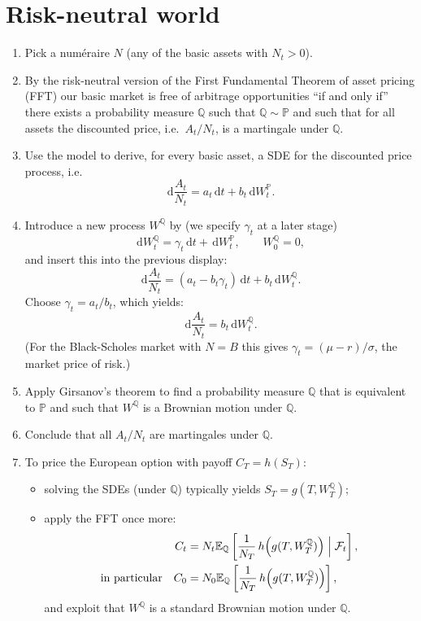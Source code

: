 \documentclass[11pt]{article}
\newcommand{\rd}{\,\mathrm{d}}
\newcommand{\kansp}{\mathbb{P}}
\newcommand{\kansq}{\mathbb{Q}}
\newcommand{\E}{\mathbb{E}}
\begin{document}
\section{Risk-neutral world}
\begin{enumerate}
\item Pick a num\'eraire $N$ (any of the basic assets with $N_t>0$).
\item By the risk-neutral version of the First Fundamental Theorem of asset pricing (FFT) our basic market is free of arbitrage opportunities ``if and only if'' there exists a probability measure $\kansq$ such that $\kansq\sim\kansp$ and such that for all assets the discounted price, i.e.\ $A_t/N_t$, is a martingale under $\kansq$.
\item Use the model to derive, for every basic asset, a SDE for the discounted price process, i.e.
\[
\rd \frac{A_t}{N_t} = a_t \rd t + b_t \rd W_t^{\kansp}.
\]
\item Introduce a new process $W^{\kansq}$ by (we specify $\gamma_t$ at a later stage)
\[
\rd W_t^{\kansq} = \gamma_t \rd t + \rd W_t^{\kansp},\qquad W_0^{\kansq}=0,
\]
and insert this into the previous display:
\[
\rd \frac{A_t}{N_t} = (a_t - b_t\gamma_t)\rd t + b_t \rd W_t^{\kansq}.
\]
Choose $\gamma_t = a_t/b_t$, which yields:
\[
\rd \frac{A_t}{N_t} = b_t \rd W_t^{\kansq}.
\]
(For the Black-Scholes market with $N=B$ this gives $\gamma_t=(\mu-r)/\sigma$, the market price of risk.)
\item Apply Girsanov's theorem to find a probability measure $\kansq$ that is equivalent to $\kansp$ and such that $W^{\kansq}$ is a Brownian motion under $\kansq$.
\item Conclude that all $A_t/N_t$ are martingales under $\kansq$.
\item To price the European option with payoff $C_T=h(S_T)$:
\begin{itemize}
\item solving the SDEs (under $\kansq$) typically yields $S_T = g(T, W_T^{\kansq})$;
\item apply the FFT once more:
\begin{align*}
C_t &= N_t \E_{\kansq}\left[ \frac{1}{N_T}\, h\!\left(g(T, W_T^{\kansq})\right) \Bigm| \mathcal{F}_t \right],\\
\text{in particular}\quad
C_0 &= N_0 \E_{\kansq}\left[ \frac{1}{N_T}\, h\!\left(g(T, W_T^{\kansq})\right) \right],
\end{align*}
and exploit that $W^{\kansq}$ is a standard Brownian motion under $\kansq$.
\end{itemize}
\end{enumerate}
\end{document}
